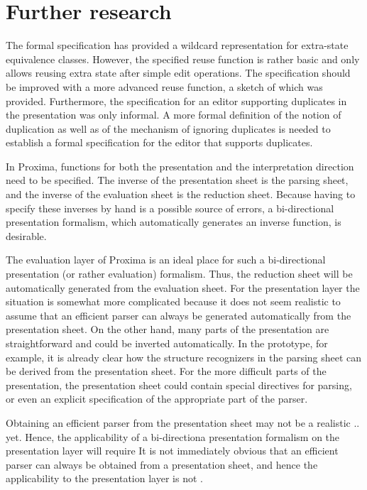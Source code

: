 \section{Further research}

The formal specification has provided a wildcard representation for extra-state equivalence classes. However, the specified reuse function is rather basic and only allows reusing extra state after simple edit operations. The specification should be improved with a more advanced reuse function, a sketch of which was provided. 
Furthermore, the specification for an editor supporting duplicates in the presentation was only informal. A more formal definition of the notion of duplication as well as of the mechanism of ignoring duplicates is needed to establish a formal specification for the editor that supports duplicates. 

In Proxima, functions for both the presentation and the interpretation direction need to be specified. The inverse of the presentation sheet is the parsing sheet, and the inverse of the evaluation sheet is the reduction sheet. Because having to  specify these inverses by hand is a possible source of errors, a bi-directional presentation formalism, which automatically generates an inverse function, is desirable. 

The evaluation layer of Proxima is an ideal place for such  a bi-directional presentation (or rather evaluation) formalism. Thus, the reduction sheet will be automatically generated from the evaluation sheet. For the presentation layer the situation is somewhat more complicated because it does not seem realistic to assume that an efficient parser can always be generated automatically from the presentation sheet. On the other hand, many parts of the presentation are straightforward and could be inverted automatically. In the prototype, for example, it is already clear how the structure recognizers in the parsing sheet can be derived from the presentation sheet. For the more difficult parts of the presentation, the presentation sheet could contain special directives for parsing, or even an explicit specification of the appropriate part of the parser.


\bc Obtaining an efficient parser from the presentation sheet may not be a realistic .. yet. Hence, the applicability of a bi-directiona presentation formalism on the presentation layer will require It is not immediately obvious that an efficient parser can always be obtained from a presentation sheet, and hence the applicability to the presentation layer is not . \ec

